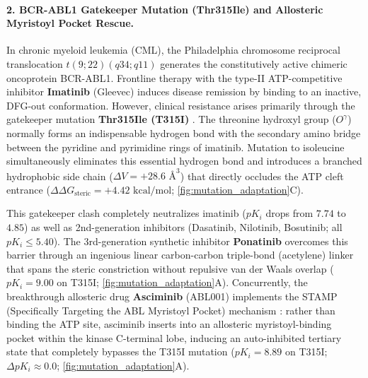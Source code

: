 \documentclass{article}
\theoremstyle{definition}
\begin{document}
\paragraph{2. BCR-ABL1 Gatekeeper Mutation (Thr315Ile) and Allosteric Myristoyl Pocket Rescue.}
In chronic myeloid leukemia (CML), the Philadelphia chromosome reciprocal translocation $t(9;22)(q34;q11)$ generates the constitutively active chimeric oncoprotein BCR-ABL1. Frontline therapy with the type-II ATP-competitive inhibitor \textbf{Imatinib} (Gleevec) induces disease remission by binding to an inactive, DFG-out conformation. However, clinical resistance arises primarily through the gatekeeper mutation \textbf{Thr315Ile (T315I)} \citep{gorre2001clinical}. The threonine hydroxyl group ($O^\gamma$) normally forms an indispensable hydrogen bond with the secondary amino bridge between the pyridine and pyrimidine rings of imatinib. Mutation to isoleucine simultaneously eliminates this essential hydrogen bond and introduces a branched hydrophobic side chain ($\Delta V = +28.6\text{ \AA}^3$) that directly occludes the ATP cleft entrance ($\Delta\Delta G_{\text{steric}} = +4.42\text{ kcal/mol}$; \cref{fig:mutation_adaptation}C).

This gatekeeper clash completely neutralizes imatinib ($pK_i$ drops from $7.74$ to $4.85$) as well as 2nd-generation inhibitors (Dasatinib, Nilotinib, Bosutinib; all $pK_i \le 5.40$). The 3rd-generation synthetic inhibitor \textbf{Ponatinib} overcomes this barrier through an ingenious linear carbon-carbon triple-bond (acetylene) linker that spans the steric constriction without repulsive van der Waals overlap ($pK_i = 9.00$ on T315I; \cref{fig:mutation_adaptation}A). Concurrently, the breakthrough allosteric drug \textbf{Asciminib} (ABL001) implements the STAMP (Specifically Targeting the ABL Myristoyl Pocket) mechanism \citep{schoepfer2018discovery}: rather than binding the ATP site, asciminib inserts into an allosteric myristoyl-binding pocket within the kinase C-terminal lobe, inducing an auto-inhibited tertiary state that completely bypasses the T315I mutation ($pK_i = 8.89$ on T315I; $\Delta pK_i \approx 0.0$; \cref{fig:mutation_adaptation}A).
\end{document}
